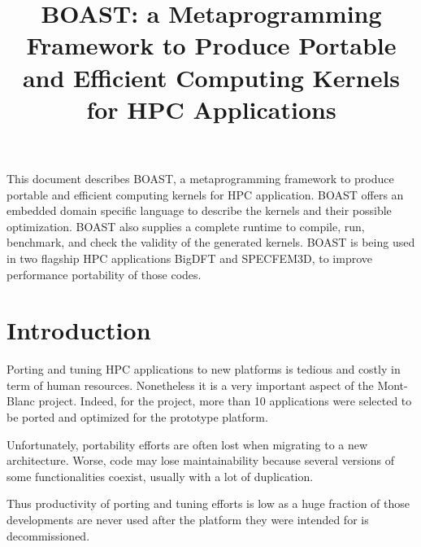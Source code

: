 \documentclass[11pt, a4paper, twoside]{montblanc}
\begin{document}
\title{BOAST: a Metaprogramming Framework to Produce Portable and Efficient Computing Kernels for HPC Applications}

\maketitle

\begin{changelog}
\end{changelog}

\frontmatter

\begin{executive}
This document describes BOAST, a metaprogramming framework to produce portable
and efficient computing kernels for HPC application. BOAST offers an embedded
domain specific language to describe the kernels and their possible
optimization. BOAST also supplies a complete runtime to compile, run, benchmark,
and check the validity of the generated kernels. BOAST is being used in two
flagship HPC applications BigDFT and SPECFEM3D, to improve performance
portability of those codes.
\end{executive}

\section{Introduction}

Porting and tuning HPC applications to new platforms is tedious and costly in
term of human resources. Nonetheless it is a very important aspect of the
Mont-Blanc project. Indeed, for the project, more than 10 applications were
selected to be ported and optimized for the prototype platform.

Unfortunately, portability efforts are often lost when migrating to a new
architecture. Worse, code may lose maintainability because several versions of
some functionalities coexist, usually with a lot of duplication.

Thus productivity of porting and tuning efforts is low as a huge fraction of
those developments are never used after the platform they were intended for is
decommissioned.
\end{document}
